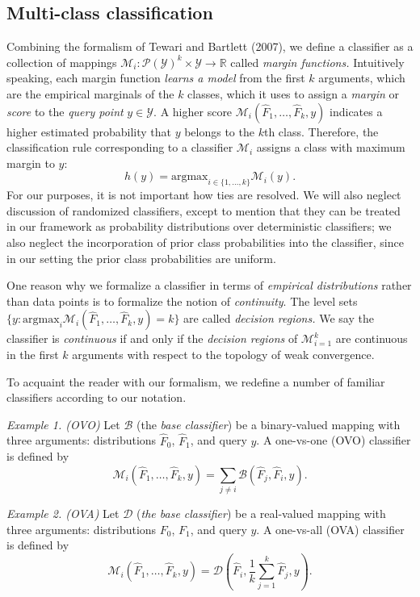 \documentclass{article}
\newcommand{\argmax}{\text{argmax}}
\begin{document}
\subsection{Multi-class classification}


Combining the formalism of Tewari and Bartlett (2007),
we define a classifier as a collection of mappings
$\mathcal{M}_i: \mathcal{P}(\mathcal{Y})^k \times \mathcal{Y} \to \mathbb{R}$ called \emph{margin functions.}
Intuitively speaking, each margin function \emph{learns a model} from the first $k$ arguments, which are
the empirical marginals of the $k$ classes, which it uses to assign a \emph{margin} or \emph{score} to the
\emph{query point} $y \in \mathcal{Y}$.  A higher score $\mathcal{M}_i(\hat{F}_1,\hdots, \hat{F}_k, y)$ indicates a higher estimated probability that $y$ belongs to the $k$th class.  
Therefore, the classification rule corresponding to a classifier $\mathcal{M}_i$ assigns
a class with maximum margin to $y$:
\[
h(y) = \argmax_{i \in \{1,\hdots, k\}} \mathcal{M}_i(y).
\]
For our purposes, it is not important how ties are resolved.  We will also neglect discussion of randomized classifiers,
except to mention that they can be treated in our framework as probability distributions over deterministic classifiers;
we also neglect the incorporation of prior class probabilities into the classifier, since in our setting
the prior class probabilities are uniform.

One reason why we formalize a classifier in terms of \emph{empirical distributions} rather than data points
is to formalize the notion of \emph{continuity}.
The level sets $\{y: \argmax_i \mathcal{M}_i(\hat{F}_1,\hdots, \hat{F}_k, y) = k\}$ are called
\emph{decision regions.}  We say the classifier is \emph{continuous}
if and only if the \emph{decision regions} of $\mathcal{M}_{i=1}^k$ are
continuous in the first $k$ arguments with respect to the topology of
weak convergence.

To acquaint the reader with our formalism, we redefine a number of familiar classifiers according to our notation.

\noindent\emph{Example 1. (OVO)} Let $\mathcal{B}$ (the \emph{base classifier}) be a binary-valued mapping with three arguments: distributions $\hat{F}_0$,
$\hat{F}_1$, and query $y$.  A one-vs-one (OVO)
classifier is defined by
\[
\mathcal{M}_i(\hat{F}_1,\hdots, \hat{F}_k, y) = \sum_{j \neq i} \mathcal{B}(\hat{F}_j, \hat{F}_i, y).
\]

\noindent\emph{Example 2. (OVA)}  Let $\mathcal{D}$ (\emph{the base classifier}) be a real-valued mapping with three arguments: 
distributions $F_0$, $F_1$, and query $y$.  A one-vs-all (OVA) classifier is defined by
\[
\mathcal{M}_i(\hat{F}_1,\hdots, \hat{F}_k, y) = \mathcal{D}(\hat{F}_i, \frac{1}{k}\sum_{j = 1}^k \hat{F}_j, y).
\]
\end{document}
